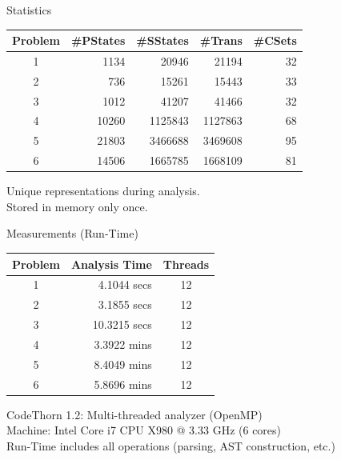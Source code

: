\begin{frame}{Statistics}
\begin{center}
\begin{tabular}{|c|r|r|r|r|}\hline
Problem & \#PStates &\#SStates &\#Trans &\#CSets \\\hline\hline
1 &1134 & 20946 & 21194 & 32 \\\hline
2 &736 & 15261 & 15443 & 33 \\\hline
3 &1012 & 41207 & 41466 & 32 \\\hline
4 &10260 & 1125843 & 1127863 & 68 \\\hline
5 &21803 & 3466688 & 3469608 & 95 \\\hline
6 &14506 & 1665785 & 1668109 & 81 \\\hline
\end{tabular}

\vspace{0.6cm}
Unique representations during analysis.\\
Stored in memory only once.
\end{center}
\end{frame}

\begin{frame}{Measurements (Run-Time)}
\begin{center}
\begin{tabular}{|c|r|c|}\hline
Problem& Analysis Time & Threads\\\hline\hline
1& 4.1044 secs & 12\\\hline
2& 3.1855 secs& 12\\\hline
3& 10.3215 secs& 12\\\hline
4& 3.3922 mins& 12\\\hline
5& 8.4049 mins& 12\\\hline
6& 5.8696 mins& 12\\\hline
\end{tabular}

\vspace{0.5cm}
CodeThorn 1.2: Multi-threaded analyzer (OpenMP)\\
Machine: Intel Core i7 CPU X980 @ 3.33 GHz (6 cores)\\
Run-Time includes all operations (parsing, AST construction, etc.) 
\end{center}

\end{frame}

